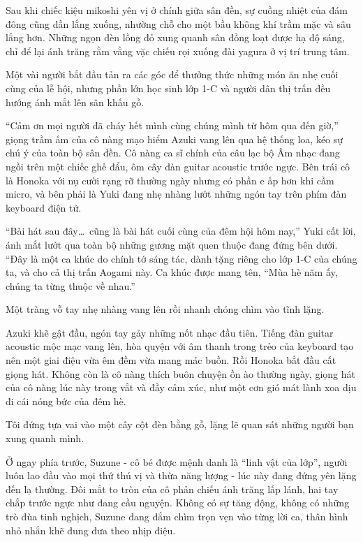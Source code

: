\documentclass[../main.tex]{subfiles}
\begin{document}
\ct

Sau khi chiếc kiệu mikoshi yên vị ở chính giữa sân đền, sự cuồng nhiệt của đám đông cũng dần lắng xuống, nhường chỗ cho một bầu không khí trầm mặc và sâu lắng hơn. Những ngọn đèn lồng đỏ xung quanh sân đồng loạt được hạ độ sáng, chỉ để lại ánh trăng rằm vằng vặc chiếu rọi xuống đài yagura ở vị trí trung tâm.

Một vài người bắt đầu tản ra các góc để thưởng thức những món ăn nhẹ cuối cùng của lễ hội, nhưng phần lớn học sinh lớp 1-C và người dân thị trấn đều hướng ánh mắt lên sân khấu gỗ.

``Cảm ơn mọi người đã cháy hết mình cùng chúng mình từ hôm qua đến giờ,'' giọng trầm ấm của cô nàng mạo hiểm Azuki vang lên qua hệ thống loa, kéo sự chú ý của toàn bộ sân đền. Cô nàng ca sĩ chính của câu lạc bộ Âm nhạc đang ngồi trên một chiếc ghế đẩu, ôm cây đàn guitar acoustic trước ngực. Bên trái cô là Honoka với nụ cười rạng rỡ thường ngày nhưng có phần e ấp hơn khi cầm micro, và bên phải là Yuki đang nhẹ nhàng lướt những ngón tay trên phím đàn keyboard điện tử.

``Bài hát sau đây\dots\ cũng là bài hát cuối cùng của đêm hội hôm nay,'' Yuki cất lời, ánh mắt lướt qua toàn bộ những gương mặt quen thuộc đang đứng bên dưới. ``Đây là một ca khúc do chính tớ sáng tác, dành tặng riêng cho lớp 1-C của chúng ta, và cho cả thị trấn Aogami này. Ca khúc được mang tên, ``Mùa hè năm ấy, chúng ta từng thuộc về nhau.'' %

Một tràng vỗ tay nhẹ nhàng vang lên rồi nhanh chóng chìm vào tĩnh lặng.

Azuki khẽ gật đầu, ngón tay gảy những nốt nhạc đầu tiên. Tiếng đàn guitar acoustic mộc mạc vang lên, hòa quyện với âm thanh trong trẻo của keyboard tạo nên một giai điệu vừa êm đềm vừa mang mác buồn. Rồi Honoka bắt đầu cất giọng hát. Không còn là cô nàng thích buôn chuyện ồn ào thường ngày, giọng hát của cô nàng lúc này trong vắt và đầy cảm xúc, như một cơn gió mát lành xoa dịu đi cái nóng bức của đêm hè.

Tôi đứng tựa vai vào một cây cột đèn bằng gỗ, lặng lẽ quan sát những người bạn xung quanh mình.

Ở ngay phía trước, Suzune - cô bé được mệnh danh là ``linh vật của lớp'', người luôn lao đầu vào mọi thứ thú vị và thừa năng lượng - lúc này đang đứng yên lặng đến lạ thường. Đôi mắt to tròn của cô phản chiếu ánh trăng lấp lánh, hai tay chắp trước ngực như đang cầu nguyện. Không có sự tăng động, không có những trò đùa tinh nghịch, Suzune đang đắm chìm trọn vẹn vào từng lời ca, thân hình nhỏ nhắn khẽ đung đưa theo nhịp điệu.
\end{document}
